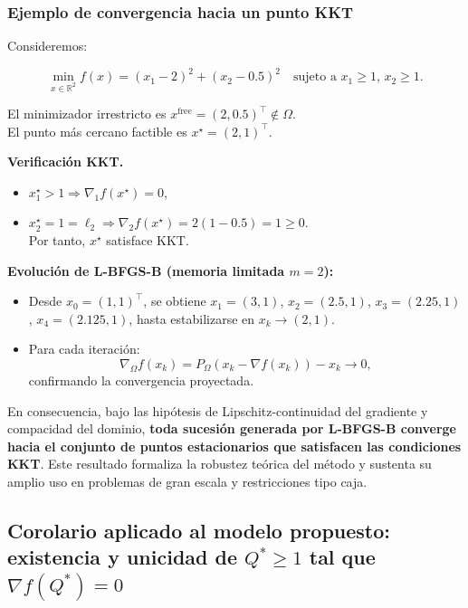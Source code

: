 \documentclass[
  spanish,
  us-letterpaper,
  DIV=11,
  numbers=noendperiod]{scrreprt}
\providecommand{\tightlist}{%
  \setlength{\itemsep}{0pt}\setlength{\parskip}{0pt}}
\numberwithin{equation}{section}
\begin{document}
\subsubsection{Ejemplo de convergencia hacia un punto
KKT}\label{ejemplo-de-convergencia-hacia-un-punto-kkt}

Consideremos:

\[
\min_{x \in \mathbb{R}^2} f(x) = (x_1 - 2)^2 + (x_2 - 0.5)^2
\quad \text{sujeto a } x_1 \ge 1,\, x_2 \ge 1. \tag{3.70}
\]

El minimizador irrestricto es
\(x^{\text{free}} = (2, 0.5)^\top \notin \Omega\).\\
El punto más cercano factible es \(x^\star = (2,1)^\top\).

\textbf{Verificación KKT.}

\begin{itemize}
\tightlist
\item
  \(x_1^\star > 1 \Rightarrow \nabla_1 f(x^\star) = 0\),\\
\item
  \(x_2^\star = 1 = \ell_2 \Rightarrow \nabla_2 f(x^\star) = 2(1 - 0.5) = 1 \ge 0\).\\
  Por tanto, \(x^\star\) satisface KKT.
\end{itemize}

\textbf{Evolución de L-BFGS-B (memoria limitada \(m = 2\)):}

\begin{itemize}
\tightlist
\item
  Desde \(x_0 = (1,1)^\top\), se obtiene \(x_1 = (3,1)\),
  \(x_2 = (2.5,1)\), \(x_3 = (2.25,1)\), \(x_4 = (2.125,1)\), hasta
  estabilizarse en \(x_k \to (2,1)\).
\item
  Para cada iteración: \[
  \nabla_\Omega f(x_k) = P_\Omega(x_k - \nabla f(x_k)) - x_k \to 0,
  \] confirmando la convergencia proyectada.
\end{itemize}

En consecuencia, bajo las hipótesis de Lipschitz-continuidad del
gradiente y compacidad del dominio, \textbf{toda sucesión generada por
L-BFGS-B converge hacia el conjunto de puntos estacionarios que
satisfacen las condiciones KKT}. Este resultado formaliza la robustez
teórica del método y sustenta su amplio uso en problemas de gran escala
y restricciones tipo caja.

\subsection{\texorpdfstring{Corolario aplicado al modelo propuesto:
existencia y unicidad de \(Q^* \ge 1\) tal que
\(\nabla f(Q^*) = 0\)}{Corolario aplicado al modelo propuesto: existencia y unicidad de Q\^{}* \textbackslash ge 1 tal que \textbackslash nabla f(Q\^{}*) = 0}}\label{corolario-aplicado-al-modelo-propuesto-existencia-y-unicidad-de-q-ge-1-tal-que-nabla-fq-0}
\end{document}
